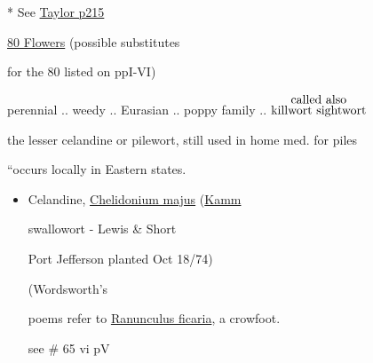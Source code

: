 \documentclass[a4paper,10pt]{article}
\begin{document}
\color{blue}
\begin{flushright}
\par
\end{flushright}
\begin{flushleft}
\color{red} 
\begin{turn}{25}%
* See \ul{Taylor p215} 
\end{turn}
\ul{80 Flowers} (possible substitutes\par
\color{red}
for the 80 listed on ppI-VI) \hfill \color{blue} \par
\color{red}
\small
 perennial .. weedy .. Eurasian .. poppy family .. {$\stackrel{\hbox{called also}}{\hbox{killwort sightwort}}$}\par
 the lesser celandine or pilewort, still used in home med. for piles\par
``occurs locally in Eastern states.\par
\begin{itemize}
\color{blue}
\normalsize
\item Celandine, \ul{Chelidonium majus} (\ul{Kamm}\par
\tiny 
\color{red}
swallowort - Lewis \& Short\par
\color{blue}
\normalsize
\color{red}
 \color{blue}Port Jefferson planted Oct 18/74)\par
\color{red}
\small
{} (Wordsworth's
 poems refer to \ul{Ranunculus ficaria}, a crowfoot.\par
see \# 65 vi pV 

\end{itemize}
\end{flushleft}
\end{document}

